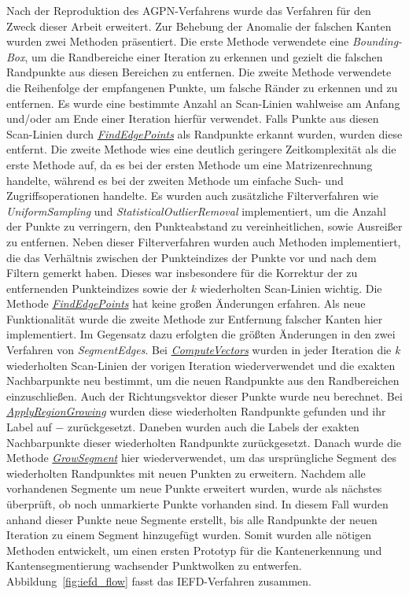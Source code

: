 Nach der Reproduktion des AGPN-Verfahrens wurde das Verfahren für den Zweck dieser Arbeit erweitert. Zur Behebung der Anomalie der falschen Kanten wurden zwei Methoden präsentiert. Die erste Methode verwendete eine \textit{Bounding-Box}, um die Randbereiche einer Iteration zu erkennen und gezielt die falschen Randpunkte aus diesen Bereichen zu entfernen. Die zweite Methode verwendete die Reihenfolge der empfangenen Punkte, um falsche Ränder zu erkennen und zu entfernen. Es wurde eine bestimmte Anzahl an Scan-Linien wahlweise am Anfang und/oder am Ende einer Iteration hierfür verwendet. Falls Punkte aus diesen Scan-Linien durch \textit{\hyperref[alg:find_edge_points]{FindEdgePoints}} als Randpunkte erkannt wurden, wurden diese entfernt. Die zweite Methode wies eine deutlich geringere Zeitkomplexität als die erste Methode auf, da es bei der ersten Methode um eine Matrizenrechnung handelte, während es bei der zweiten Methode um einfache Such- und Zugriffsoperationen handelte. Es wurden auch zusätzliche Filterverfahren wie \textit{UniformSampling} und \textit{StatisticalOutlierRemoval} \autocite{rusu_3d_2011} \autocite{rusu_towards_2008} implementiert, um die Anzahl der Punkte zu verringern, den Punkteabstand zu vereinheitlichen, sowie Ausreißer zu entfernen. Neben dieser Filterverfahren wurden auch Methoden implementiert, die das Verhältnis zwischen der Punkteindizes der Punkte vor und nach dem Filtern gemerkt haben. Dieses war insbesondere für die Korrektur der zu entfernenden Punkteindizes sowie der \textit{k} wiederholten Scan-Linien wichtig. Die Methode \textit{\hyperref[alg:find_edge_points]{FindEdgePoints}} hat keine großen Änderungen erfahren. Als neue Funktionalität wurde die zweite Methode zur Entfernung falscher Kanten hier implementiert. Im Gegensatz dazu erfolgten die größten Änderungen in den zwei Verfahren von \textit{SegmentEdges}. Bei \textit{\hyperref[alg:compute_vectors]{ComputeVectors}} wurden in jeder Iteration die \textit{k} wiederholten Scan-Linien der vorigen Iteration wiederverwendet und die exakten Nachbarpunkte neu bestimmt, um die neuen Randpunkte aus den Randbereichen einzuschließen. Auch der Richtungsvektor dieser Punkte wurde neu berechnet. Bei \textit{\hyperref[alg:apply_region_growing]{ApplyRegionGrowing}} wurden diese wiederholten Randpunkte gefunden und ihr Label auf $-$ zurückgesetzt. Daneben wurden auch die Labels der exakten Nachbarpunkte dieser wiederholten Randpunkte zurückgesetzt. Danach wurde die Methode \textit{\hyperref[alg:grow_segment]{GrowSegment}} hier wiederverwendet, um das ursprüngliche Segment des wiederholten Randpunktes mit neuen Punkten zu erweitern. Nachdem alle vorhandenen Segmente um neue Punkte erweitert wurden, wurde als nächstes überprüft, ob noch unmarkierte Punkte vorhanden sind. In diesem Fall wurden anhand dieser Punkte neue Segmente erstellt, bis alle Randpunkte der neuen Iteration zu einem Segment hinzugefügt wurden. Somit wurden alle nötigen Methoden entwickelt, um einen ersten Prototyp für die Kantenerkennung und Kantensegmentierung wachsender Punktwolken zu entwerfen. Abbildung~\ref{fig:iefd_flow} fasst das IEFD-Verfahren zusammen.

